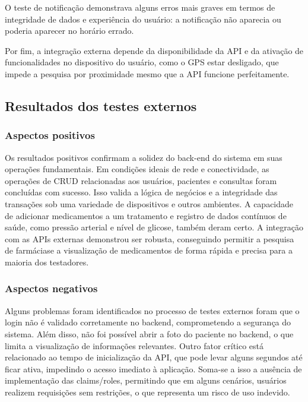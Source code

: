 \documentclass[
	article,			%
	12pt,				%
	oneside,			%
	a4paper,			%
    BIBLATEX,           %
	english,			%
	brazil,				%
	sumario=tradicional
	]{abntex2}
\begin{document}
O teste de notificação demonstrava alguns erros mais graves em termos de integridade de dados e experiência do usuário: a notificação não aparecia ou poderia aparecer no horário errado.

Por fim, a integração externa depende da disponibilidade da API e da ativação de funcionalidades no dispositivo do usuário, como o GPS estar desligado, que impede a pesquisa por proximidade mesmo que a API funcione perfeitamente.

\subsection {Resultados dos testes externos}

\subsubsection{Aspectos positivos}

Os resultados positivos confirmam a solidez do back-end do sistema em suas operações fundamentais. Em condições ideais de rede e conectividade, as operações de CRUD relacionadas aos usuários, pacientes e consultas foram concluídas com sucesso. Isso valida a lógica de negócios e a integridade das transações sob uma variedade de dispositivos e outros ambientes. A capacidade de adicionar medicamentos a um tratamento e registro de dados contínuos de saúde, como pressão arterial e nível de glicose, também deram certo. A integração com as APIs externas demonstrou ser robusta, conseguindo permitir a pesquisa de farmáciase a visualização de medicamentos de forma rápida e precisa para a maioria dos testadores.

\subsubsection{Aspectos negativos}
Alguns problemas foram identificados no processo de testes externos foram que o login não é validado corretamente no backend, comprometendo a segurança do sistema. Além disso, não foi possível abrir a foto do paciente no backend, o que limita a visualização de informações relevantes. Outro fator crítico está relacionado ao tempo de inicialização da API, que pode levar alguns segundos até ficar ativa, impedindo o acesso imediato à aplicação. Soma-se a isso a ausência de implementação das claims/roles, permitindo que em alguns cenários, usuários realizem requisições sem restrições, o que representa um risco de uso indevido.
\end{document}
